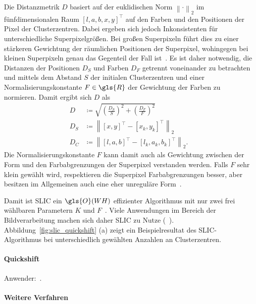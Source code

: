 Die Distanzmetrik $D$ basiert auf der euklidischen Norm ${\left\|\cdot\right\|}_2$ im fünfdimensionalen Raum ${\left[l,a,b,x,y\right]}^{\top}$ auf den Farben und den Positionen der Pixel \bzw{} der Clusterzentren.
Dabei ergeben sich jedoch Inkonsistenten für unterschiedliche Superpixelgrößen.
Bei großen Superpixeln führt dies zu einer stärkeren Gewichtung der räumlichen Positionen der Superpixel, wohingegen bei kleinen Superpixeln genau das Gegenteil der Fall ist~\cite{slic}.
Es ist daher notwendig, die Distanzen der Positionen $D_S$ und Farben $D_F$ getrennt voneinander zu betrachten und mittels dem Abstand $S$ der initialen Clusterzentren und einer Normalisierungskonstante $F \in \gls{R}$ \bzgl{} der Gewichtung der Farben zu normieren.
Damit ergibt sich $D$ als~\cite{slic}
\begin{equation*}
\begin{split}
  D & \coloneqq \sqrt{{\left(\frac{D_S}{S}\right)}^2 + {\left(\frac{D_F}{F}\right)}^2}\\
  D_S & \coloneqq {\left\|{\left[x, y\right]}^{\top} - {\left[x_k, y_k\right]}^{\top}\right\|}_2\\
  D_C & \coloneqq {\left\|{\left[l, a, b\right]}^{\top} - {\left[l_k, a_k, b_k\right]}^{\top}\right\|}_2.
\end{split}
\end{equation*}
Die Normalisierungskonstante $F$ kann damit auch als Gewichtung zwischen der Form und den Farbabgrenzungen der Superpixel verstanden werden.
Falls $F$ sehr klein gewählt wird, respektieren die Superpixel Farbabgrenzungen besser, aber besitzen im Allgemeinen auch eine eher unreguläre Form~\cite{slic}.

Damit ist \gls{SLIC} ein $\gls{O}\left(WH\right)$ effizienter Algorithmus mit nur zwei frei wählbaren Parametern $K$ und $F$~\cite{slic}.
Viele Anwendungen im Bereich der Bildverarbeitung machen sich daher \gls{SLIC} zu Nutze (\vgl{}~\cite{Gadde, supercnn, super}).
Abbildung~\ref{fig:slic_quickshift} (a) zeigt ein Beispielresultat des \gls{SLIC}-Algorithmus bei unterschiedlich gewählten Anzahlen an Clusterzentren.



\paragraph{Quickshift}
\label{quickshift}

\cite{quickshift}
Anwender:~\cite{Fulkerson}.

\paragraph{Weitere Verfahren}
\label{weitere_superpixel_verfahren}

